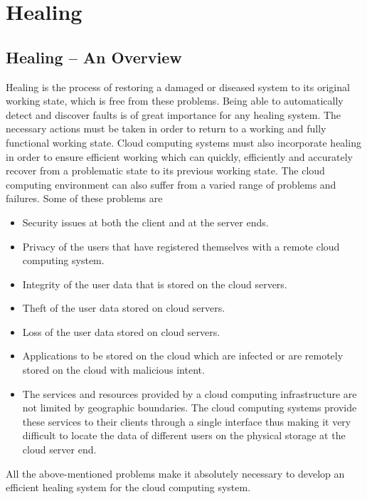
\chapter{Healing}
\section{Healing – An Overview}
Healing is the process of restoring a damaged or diseased system to its original working state, which is free from these problems. Being able to automatically detect and discover faults is of great importance for any healing system. The necessary actions must be taken in order to return to a working and fully functional working state. Cloud computing systems must also incorporate healing in order to ensure efficient working which can quickly, efficiently and accurately recover from a problematic state to its previous working state.  
The cloud computing environment can also suffer from a varied range of problems and failures. Some of these problems are 
	\begin{itemize}
		\item Security issues at both the client and at the server ends.
		\item Privacy of the users that have registered themselves with a remote cloud computing system.
		\item Integrity of the user data that is stored on the cloud servers.
		\item Theft of the user data stored on cloud servers.
		\item Loss of the user data stored on cloud servers.
		\item Applications to be stored on the cloud which are infected or are remotely stored on the cloud with malicious intent.
		\item The services and resources provided by a cloud computing infrastructure are not limited by geographic boundaries. The cloud computing systems provide these services to their clients through a single interface thus making it very difficult to locate the data of different users on the physical storage at the cloud server end.
	\end{itemize}
All the above-mentioned problems make it absolutely necessary to develop an efficient healing system for the cloud computing system.
